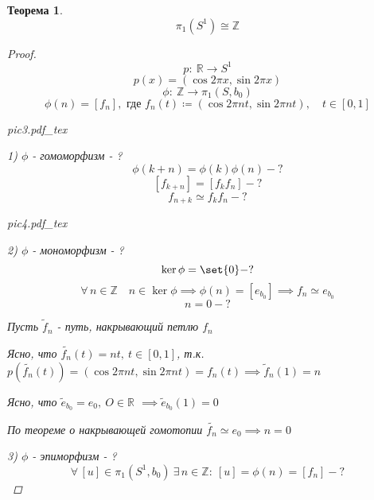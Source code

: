 \documentclass[a4paper]{article}
\DeclarePairedDelimiter\set\{\}
\newtheorem*{theorem}{Теорема}
\theoremstyle{definition}
\theoremstyle{remark}
\begin{document}
\begin{tcolorbox}[enhanced,breakable,skin first=enhanced,skin middle=enhanced,skin last=enhanced]
    \begin{theorem}
        \[
            \pi_1(S^1) \cong \mathbb{Z}
        \]

        \begin{proof}
            \[
                p: \ \mathbb{R} \to S^1
            \]
            \[
                p(x) = (\cos 2 \pi x, \sin 2 \pi x)
            \]
            \[
                \phi: \ \mathbb{Z} \to \pi_1(S, b_0)
            \]
            \[
                \phi(n) = [f_n], \text{ где } f_n(t) \coloneq (\cos 2\pi nt,
                \sin 2\pi nt), \quad t \in [0,1]
            \]
            \begin{center}
                \def\svgwidth{0.5\columnwidth}
                {pic3.pdf_tex}
            \end{center}

            1) $ \phi $ - гомоморфизм - ?
            \[
                \phi(k+n) = \phi(k) \phi(n) - ?
            \]
            \[
                [f_{k+n}] = [f_k f_n] - ?
            \]
            \[
                f_{n+k} \simeq f_k f_n - ?
            \]
            \begin{center}
                \def\svgwidth{\columnwidth}
                {pic4.pdf_tex}
            \end{center}

            2) $ \phi $ - мономорфизм - ?
            \[
                \ker \phi = \set{0} - ?
            \]
            \[
                \forall \, n \in \mathbb{Z} \quad n \in \ker \phi \implies \phi(n)
                = [e_{b_0}] \implies f_n \simeq e_{b_0}
            \]
            \[
                n = 0 - ?
            \]

            Пусть $ \widetilde{f}_n $ - путь, накрывающий петлю $ f_n $  

            Ясно, что $ \widetilde{f_n}(t) = nt, \ t \in [0,1] $, т.к.
            $ p(\widetilde{f_n}(t)) = (\cos 2\pi nt, \sin 2\pi nt) = f_n(t) \implies
            \widetilde{f}_n(1) = n$ 

            Ясно, что $ \widetilde{e}_{b_0} = e_0, \ O \in \mathbb{R} $
            $\implies \widetilde{e}_{b_0}(1) = 0$

            По теореме о накрывающей гомотопии $ \widetilde{f_n} \simeq e_0 \implies
            n = 0$ 

            3) $ \phi $ - эпиморфизм - ?
            \[
                \forall \, [u] \in \pi_1(S^1, b_0) \ \exists \, n \in \mathbb{Z}: \
                [u] = \phi(n) = [f_n] - ?
            \]


\end{proof}
\end{theorem}
\end{tcolorbox}
\end{document}
